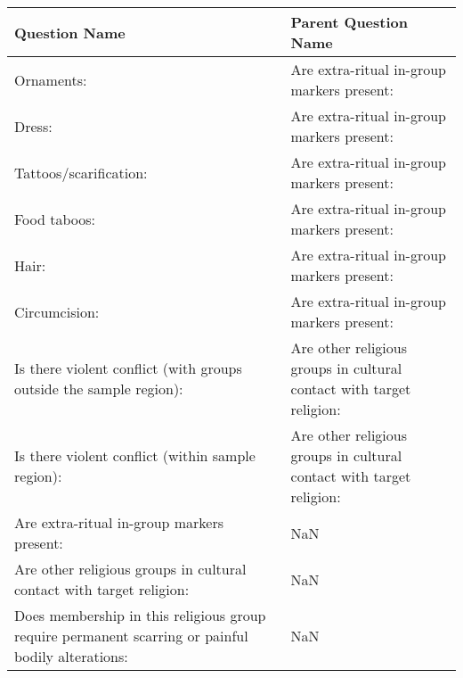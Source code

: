 \begin{tabular}{ll}
\toprule
Question Name & Parent Question Name \\
\midrule
Ornaments: & Are extra-ritual in-group markers present: \\
Dress: & Are extra-ritual in-group markers present: \\
Tattoos/scarification: & Are extra-ritual in-group markers present: \\
Food taboos: & Are extra-ritual in-group markers present: \\
Hair: & Are extra-ritual in-group markers present: \\
Circumcision: & Are extra-ritual in-group markers present: \\
Is there violent conflict (with groups outside the sample region): & Are other religious groups in cultural contact with target religion: \\
Is there violent conflict (within sample region): & Are other religious groups in cultural contact with target religion: \\
Are extra-ritual in-group markers present: & NaN \\
Are other religious groups in cultural contact with target religion: & NaN \\
Does membership in this religious group require permanent scarring or painful bodily alterations: & NaN \\
\bottomrule
\end{tabular}
